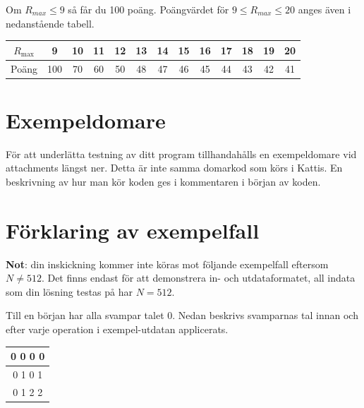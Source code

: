 Om $R_{max} \leq 9$ så får du 100 poäng.
Poängvärdet för $9 \leq R_{max} \leq 20$ anges även i nedanstående tabell.

\begin{center}
\begin{tabular}{|c|c|c|c|c|c|c|c|c|c|c|c|c|}
  \hline
  $R_{\text{max}}$ & 9 & 10 & 11 & 12 & 13 & 14 & 15 & 16 & 17 & 18 & 19 & 20 \\ \hline
  Poäng & 100 & 70 & 60 & 50 & 48 & 47 & 46 & 45 & 44 & 43 & 42 & 41 \\ \hline
\end{tabular}
\end{center}

\section*{Exempeldomare}
För att underlätta testning av ditt program tillhandahålls en exempeldomare vid attachments längst ner.
Detta är inte samma domarkod som körs i Kattis.
En beskrivning av hur man kör koden ges i kommentaren i början av koden.

\section*{Förklaring av exempelfall}

\textbf{Not}: din inskickning kommer inte köras mot följande exempelfall eftersom $N \neq 512$.
Det finns endast för att demonstrera in- och utdataformatet, all indata som din lösning testas på har $N = 512$.

Till en början har alla svampar talet $0$.
Nedan beskrivs svamparnas tal innan och efter varje operation i exempel-utdatan applicerats.

\begin{center}
  \noindent
  \begin{tabular}{|c|}
    \hline
    0 0 0 0\\ \hline
    0 1 0 1\\ \hline
    0 1 2 2\\ \hline
  \end{tabular}
\end{center}
